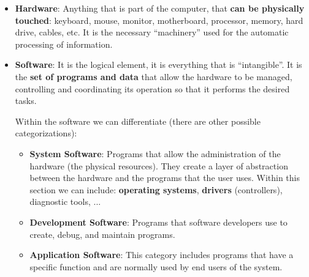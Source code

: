 \begin{itemize}
    \item \textbf{Hardware}: Anything that is part of the computer, that \textbf{can be physically touched}: keyboard, mouse, monitor, motherboard, processor, memory, hard drive, cables, etc. It is the necessary “machinery” used for the automatic processing of information.

    \item \textbf{Software}: It is the logical element, it is everything that is “intangible”. It is the \textbf{set of programs and data} that allow the hardware to be managed, controlling and coordinating its operation so that it performs the desired tasks.

    Within the software we can differentiate (there are other possible categorizations):

    \begin{itemize}
        \item \textbf{System Software}: Programs that allow the administration of the hardware (the physical resources). They create a layer of abstraction between the hardware and the programs that the user uses. Within this section we can include: \textbf{operating systems}, \textbf{drivers} (controllers), diagnostic tools, ...

        \item \textbf{Development Software}: Programs that software developers use to create, debug, and maintain programs.

        \item \textbf{Application Software}: This category includes programs that have a specific function and are normally used by end users of the system.
    \end{itemize}

\end{itemize}
